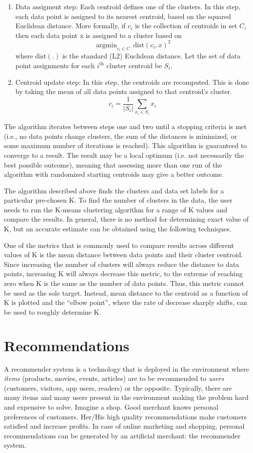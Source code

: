 \documentclass{book}
\DeclareMathOperator*{\argmin}{argmin}
\begin{document}
\begin{enumerate}
\item Data assigment step: Each centroid defines one of the clusters. In this step, each data point is assigned to its nearest centroid, based on the squared Euclidean distance. More formally, if $c_i$ is the collection of centroids in set $C$, then each data point x is assigned to a cluster based on
\[ \argmin_{c_i \in C} \, \mbox{dist}(c_i,x)^2\]
where $\mbox{dist}(.)$ is the standard (L2) Euclidean distance. Let the set of data point assignments for each $i^{\mbox{th}}$ cluster centroid be $S_i$.
\item Centroid update step: In this step, the centroids are recomputed. This is done by taking the mean of all data points assigned to that centroid's cluster.
\[ c_i = \frac{1}{|S_i|}\sum_{x_i \in S_i}x_i\]
\end{enumerate}

The algorithm iterates between steps one and two until a stopping criteria is met (i.e., no data points change clusters, the sum of the distances is minimized, or some maximum number of iterations is reached).
This algorithm is guaranteed to converge to a result. The result may be a local optimum (i.e. not necessarily the best possible outcome), meaning that assessing more than one run of the algorithm with randomized starting centroids may give a better outcome.

The algorithm described above finds the clusters and data set labels for a particular pre-chosen K. To find the number of clusters in the data, the user needs to run the K-means clustering algorithm for a range of K values and compare the results. In general, there is no method for determining exact value of K, but an accurate estimate can be obtained using the following techniques.

One of the metrics that is commonly used to compare results across different values of K is the mean distance between data points and their cluster centroid. Since increasing the number of clusters will always reduce the distance to data points, increasing K will always decrease this metric, to the extreme of reaching zero when K is the same as the number of data points. Thus, this metric cannot be used as the sole target. Instead, mean distance to the centroid as a function of K is plotted and the ``elbow point'', where the rate of decrease sharply shifts, can be used to roughly determine K.

\chapter{Recommendations}
A recommender system is a technology that is deployed in the environment where \emph{items} (products, movies, events, articles) are to be recommended to \emph{users} (customers, visitors, app users, readers) or the opposite. Typically, there are many items and many users present in the environment making the problem hard and expensive to solve. Imagine a shop. Good merchant knows personal preferences of customers. Her/His high quality recommendations make customers satisfied and increase profits. In case of online marketing and shopping, personal recommendations can be generated by an artificial merchant: the recommender system.
\end{document}
